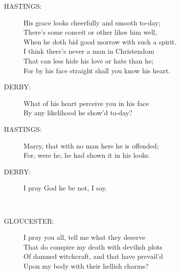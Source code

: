 \documentclass{article}
\begin{document}
\begin{description}
\item[HASTINGS:] 
\hspace{1pt}His grace looks cheerfully and smooth to-day;\\
\hspace{1pt}There's some conceit or other likes him well,\\
\hspace{1pt}When he doth bid good morrow with such a spirit.\\
\hspace{1pt}I think there's never a man in Christendom\\
\hspace{1pt}That can less hide his love or hate than he;\\
\hspace{1pt}For by his face straight shall you know his heart.\\
\end{description}
\begin{description}
\item[DERBY:] 
\hspace{1pt}What of his heart perceive you in his face\\
\hspace{1pt}By any likelihood he show'd to-day?\\
\end{description}
\begin{description}
\item[HASTINGS:] 
\hspace{1pt}Marry, that with no man here he is offended;\\
\hspace{1pt}For, were he, he had shown it in his looks.\\
\end{description}
\begin{description}
\item[DERBY:] 
\hspace{1pt}I pray God he be not, I say.\\
\end{description}
\\
\begin{description}
\item[GLOUCESTER:] 
\hspace{1pt}I pray you all, tell me what they deserve\\
\hspace{1pt}That do conspire my death with devilish plots\\
\hspace{1pt}Of damned witchcraft, and that have prevail'd\\
\hspace{1pt}Upon my body with their hellish charms?\\
\end{description}
\end{document}
